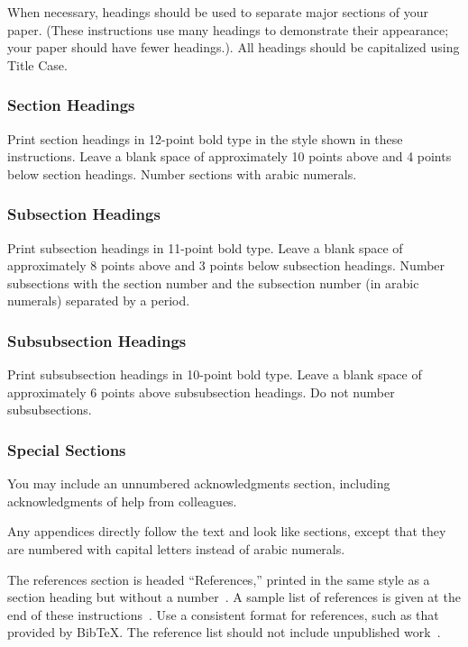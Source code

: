 \documentclass{article}
\begin{document}
When necessary, headings should be used to separate major sections of
your paper. (These instructions use many headings to demonstrate their
appearance; your paper should have fewer headings.). All headings should be capitalized using Title Case.

\subsubsection{Section Headings}

Print section headings in 12-point bold type in the style shown in
these instructions. Leave a blank space of approximately 10 points
above and 4 points below section headings.  Number sections with
arabic numerals.

\subsubsection{Subsection Headings}

Print subsection headings in 11-point bold type. Leave a blank space
of approximately 8 points above and 3 points below subsection
headings. Number subsections with the section number and the
subsection number (in arabic numerals) separated by a
period.

\subsubsection{Subsubsection Headings}

Print subsubsection headings in 10-point bold type. Leave a blank
space of approximately 6 points above subsubsection headings. Do not
number subsubsections.

\subsubsection{Special Sections}

You may include an unnumbered acknowledgments section, including
acknowledgments of help from colleagues.

Any appendices directly follow the text and look like sections, except
that they are numbered with capital letters instead of arabic
numerals.

The references section is headed ``References,'' printed in the same
style as a section heading but without a number~\cite{russell-norvig:Modern}. A sample list of
references is given at the end of these instructions~\cite{rupeneite:Reinforcement}. Use a consistent
format for references, such as that provided by Bib\TeX{}. The reference
list should not include unpublished work~\cite{trc:hs}.
\end{document}
